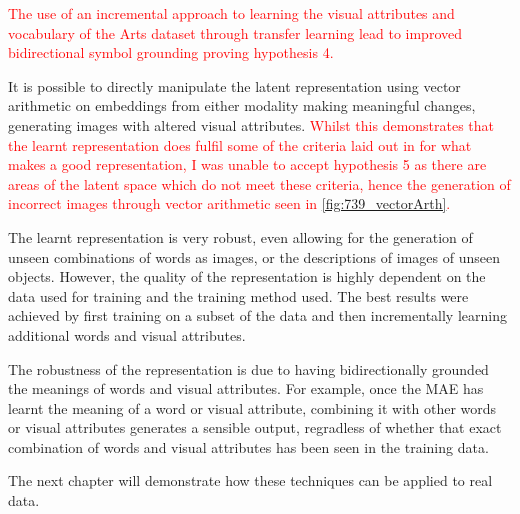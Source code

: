 \textcolor{red}{The use of an incremental approach to learning the visual attributes and vocabulary of the Arts dataset through transfer learning lead to improved bidirectional symbol grounding proving hypothesis 4.}

It is possible to directly manipulate the latent representation using vector arithmetic on embeddings from either modality making meaningful changes, generating images with altered visual attributes. \textcolor{red}{Whilst this demonstrates that the learnt representation does fulfil some of the criteria laid out in \cite{repRev} for what makes a good representation, I was unable to accept hypothesis 5 as there are areas of the latent space which do not meet these criteria, hence the generation of incorrect images through vector arithmetic seen in \ref{fig:739_vectorArth}.}

The learnt representation is very robust, even allowing for the generation of unseen combinations of words as images, or the descriptions of images of unseen objects. However, the quality of the representation is highly dependent on the data used for training and the training method used. The best results were achieved by first training on a subset of the data and then incrementally learning additional words and visual attributes.

The robustness of the representation is due to having bidirectionally grounded the meanings of words and visual attributes. For example, once the \ac{MAE} has learnt the meaning of a word or visual attribute, combining it with other words or visual attributes generates a sensible output, regradless of whether that exact combination of words and visual attributes has been seen in the training data.

The next chapter will demonstrate how these techniques can be applied to real data.


